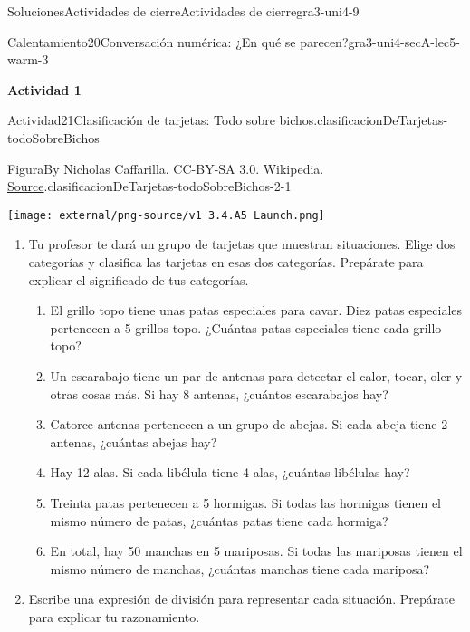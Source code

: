 \documentclass[twoside,10pt,]{article}
\begin{document}
\begin{solutions-section}{Soluciones}{Actividades de cierre}{}{Actividades de cierre}{}{}{gra3-uni4-9}
\begin{explorationsolution}{Calentamiento}{20}{Conversación numérica: ¿En qué se parecen?}{gra3-uni4-secA-lec5-warm-3}
\begin{enumerate}
\end{enumerate}
%
\end{explorationsolution}%
\par\medskip
\noindent\textbf{\large{}\space\textperiodcentered\space{}Actividad 1}
\begin{activitysolution}{Actividad}{21}{Clasificación de tarjetas: Todo sobre bichos.}{clasificacionDeTarjetas-todoSobreBichos}%
\begin{figureptx}{Figura}{By Nicholas Caffarilla. CC-BY-SA 3.0. Wikipedia. \href{https://en.wikipedia.org/wiki/Insect\#/media/File:Insect_collage.png}{Source}\protect\footnotemark{}.}{clasificacionDeTarjetas-todoSobreBichos-2-1}{}%
\begin{image}{0.25}{0.5}{0.25}{}%
\texttt{[image: external/png-source/v1 3.4.A5 Launch.png]}
\end{image}%
\tcblower
\end{figureptx}%
%
\begin{enumerate}
\item{}Tu profesor te dará un grupo de tarjetas que muestran situaciones. Elige dos categorías y clasifica las tarjetas en esas dos categorías. Prepárate para explicar el significado de tus categorías.%
%
\begin{enumerate}[label=(\Alph*)]
\item{}El grillo topo tiene unas patas especiales para cavar. Diez patas especiales pertenecen a 5 grillos topo. ¿Cuántas patas especiales tiene cada grillo topo?%
\item{}Un escarabajo tiene un par de antenas para detectar el calor, tocar, oler y otras cosas más. Si hay 8 antenas, ¿cuántos escarabajos hay?%
\item{}Catorce antenas pertenecen a un grupo de abejas. Si cada abeja tiene 2 antenas, ¿cuántas abejas hay?%
\item{}Hay 12 alas. Si cada libélula tiene 4 alas, ¿cuántas libélulas hay?%
\item{}Treinta patas pertenecen a 5 hormigas. Si todas las hormigas tienen el mismo número de patas, ¿cuántas patas tiene cada hormiga?%
\item{}En total, hay 50 manchas en 5 mariposas. Si todas las mariposas tienen el mismo número de manchas, ¿cuántas manchas tiene cada mariposa?%
\end{enumerate}
\item{}Escribe una expresión de división para representar cada situación. Prepárate para explicar tu razonamiento.%
\end{enumerate}

\end{activitysolution}
\end{solutions-section}
\end{document}
